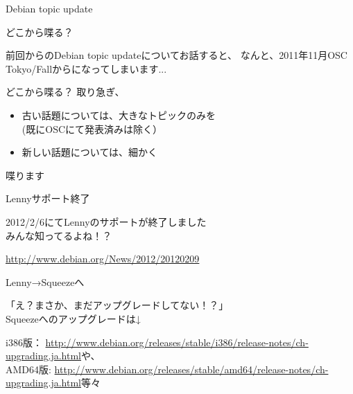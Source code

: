 \begin{frame}
\begin{center}
\LARGE{Debian topic update}
\end{center}
\end{frame}

\begin{frame}{どこから喋る？}
\begin{center}
\Large{前回からのDebian topic updateについてお話すると、
なんと、2011年11月OSC Tokyo/Fallからになってしまいます...}
\end{center}
\end{frame}

\begin{frame}{どこから喋る？}
\Large
取り急ぎ、
\begin{itemize}
\item 古い話題については、大きなトピックのみを\\
(既にOSCにて発表済みは除く）
\item 新しい話題については、細かく
\end{itemize}
喋ります
\end{frame}

\begin{frame}{Lennyサポート終了}

\begin{center}
\LARGE{2012/2/6にてLennyのサポートが終了しました\\
みんな知ってるよね！？}
\end{center}
\url{http://www.debian.org/News/2012/20120209}
\end{frame}

\begin{frame}{Lenny→Squeezeへ}

\begin{center}
\LARGE{「え？まさか、まだアップグレードしてない！？」\\Squeezeへのアップグレードは↓}
\end{center}
i386版：
\url{http://www.debian.org/releases/stable/i386/release-notes/ch-upgrading.ja.html}や、\\
AMD64版:
\url{http://www.debian.org/releases/stable/amd64/release-notes/ch-upgrading.ja.html}等々
\end{frame}

